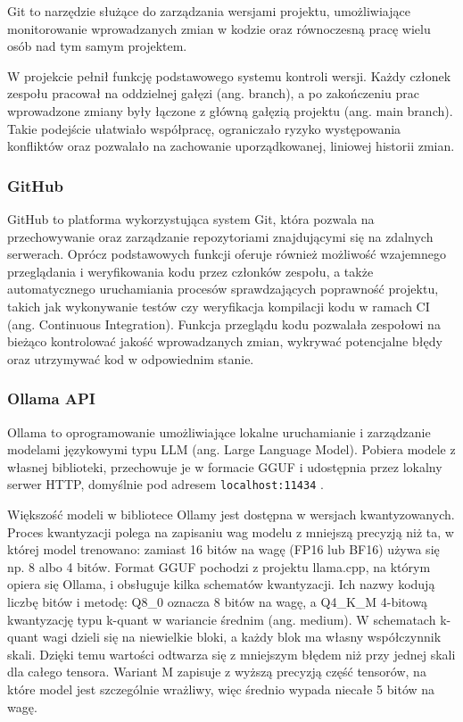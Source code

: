 Git to narzędzie służące do zarządzania wersjami projektu, umożliwiające monitorowanie wprowadzanych zmian w kodzie oraz równoczesną pracę wielu osób nad tym samym projektem.

W projekcie pełnił funkcję podstawowego systemu kontroli wersji. Każdy członek zespołu pracował na oddzielnej gałęzi (ang. branch), a po zakończeniu prac wprowadzone zmiany były łączone z główną gałęzią projektu (ang. main branch). Takie podejście ułatwiało współpracę, ograniczało ryzyko występowania konfliktów oraz pozwalało na zachowanie uporządkowanej, liniowej historii zmian.

\subsubsection{GitHub}

GitHub to platforma wykorzystująca system Git, która pozwala na przechowywanie oraz zarządzanie repozytoriami znajdującymi się na zdalnych serwerach. Oprócz podstawowych funkcji oferuje również możliwość wzajemnego przeglądania i weryfikowania kodu przez członków zespołu, a także automatycznego uruchamiania procesów sprawdzających poprawność projektu, takich jak wykonywanie testów czy weryfikacja kompilacji kodu w ramach CI (ang. Continuous Integration). Funkcja przeglądu kodu pozwalała zespołowi na bieżąco kontrolować jakość wprowadzanych zmian, wykrywać potencjalne błędy oraz utrzymywać kod w odpowiednim stanie.

\subsubsection{Ollama API}

Ollama to oprogramowanie umożliwiające lokalne uruchamianie i zarządzanie modelami językowymi typu LLM (ang. Large Language Model). Pobiera modele z własnej biblioteki, przechowuje je w formacie GGUF i udostępnia przez lokalny serwer HTTP, domyślnie pod adresem \texttt{localhost:11434} \cite{ollama_api_reference}.

Większość modeli w bibliotece Ollamy jest dostępna w wersjach kwantyzowanych. Proces kwantyzacji polega na zapisaniu wag modelu z mniejszą precyzją niż ta, w której model trenowano: zamiast 16 bitów na wagę (FP16 lub BF16) używa się np. 8 albo 4 bitów. Format GGUF pochodzi z projektu llama.cpp, na którym opiera się Ollama, i obsługuje kilka schematów kwantyzacji. Ich nazwy kodują liczbę bitów i metodę: Q8\_0 oznacza 8 bitów na wagę, a Q4\_K\_M 4-bitową kwantyzację typu k-quant w wariancie średnim (ang. medium). W schematach k-quant wagi dzieli się na niewielkie bloki, a każdy blok ma własny współczynnik skali. Dzięki temu wartości odtwarza się z mniejszym błędem niż przy jednej skali dla całego tensora. Wariant M zapisuje z wyższą precyzją część tensorów, na które model jest szczególnie wrażliwy, więc średnio wypada niecałe 5 bitów na wagę.

